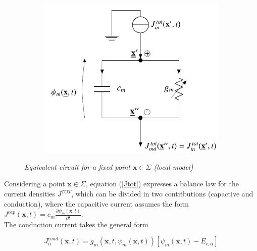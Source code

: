 \documentclass[12pt, a4paper]{report}
\begin{document}
\begin{figure}[H]
	
		
	
			\begin{figure}[H]
				\centering
				\includegraphics[scale=0.6]{ode_circuit.png}
				
			\end{figure}
		
	\caption{\textit{Equivalent circuit for a fixed point $\textbf{x} \in \Sigma$ (local model)
		}} \label{circuit}
\end{figure}


Considering  a point $\textbf{x} \in \Sigma$, equation (\ref*{Jtot}) expresses a balance law for the current densities $J^{TOT}$, which can be divided in two contributions (capactive and conduction), where the capacitive current assumes the form $J^{cap}(\textbf{x},t) = c_m \frac{\partial \psi_m(\textbf{x},t)}{\partial t}$.\\
The conduction current takes the general form 

\begin{equation}
J^{cond}_{\alpha}(\textbf{x},t) = g_m(\textbf{x},t,\psi_m(\textbf{x},t)) [\psi_m(\textbf{x},t) - E_{c,\alpha}] \label{conduction current}
\end{equation}
\end{document}

